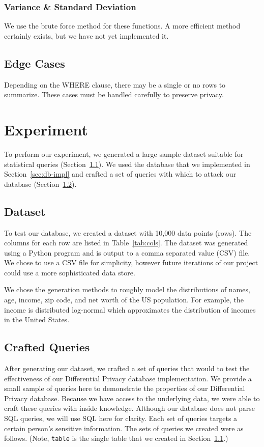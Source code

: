 \documentclass[conference,11pt]{IEEEtran}
\begin{document}
\subsubsection{Variance \& Standard Deviation}
We use the brute force method for these functions. A more efficient method
certainly exists, but we have not yet implemented it.

\subsection{Edge Cases}\label{sec:edge-cases}
Depending on the WHERE clause, there may be a single or no rows to
summarize. These cases must be handled carefully to preserve privacy.

\section{Experiment}\label{sec:experiment}
To perform our experiment, we generated a large sample dataset suitable for
statistical queries (Section~\ref{sec:dataset}). We used the database that we
implemented in Section~\ref{sec:db-impl} and crafted a set of queries with which
to attack our database (Section~\ref{sec:crafted-queries}).

\subsection{Dataset}\label{sec:dataset}
To test our database, we created a dataset with 10,000 data points (rows). The
columns for each row are listed in Table~\ref{tab:cols}.  The dataset was
generated using a Python program and is output to a comma separated value (CSV)
file. We chose to use a CSV file for simplicity, however future iterations of
our project could use a more sophisticated data store.

We chose the generation methods to roughly model the distributions of names,
age, income, zip code, and net worth of the US population. For example, the
income is distributed log-normal which approximates the distribution of incomes
in the United States.

\subsection{Crafted Queries}\label{sec:crafted-queries}
After generating our dataset, we crafted a set of queries that would to test the
effectiveness of our Differential Privacy database implementation. We provide a
small sample of queries here to demonstrate the properties of our Differential
Privacy database. Because we have access to the underlying data, we were able to
craft these queries with inside knowledge. Although our database does not parse
SQL queries, we will use SQL here for clarity. Each set of queries targets a
certain person's sensitive information. The sets of queries we created were as
follows. (Note, \texttt{table} is the single table that we created in
Section~\ref{sec:dataset}.)
\end{document}
